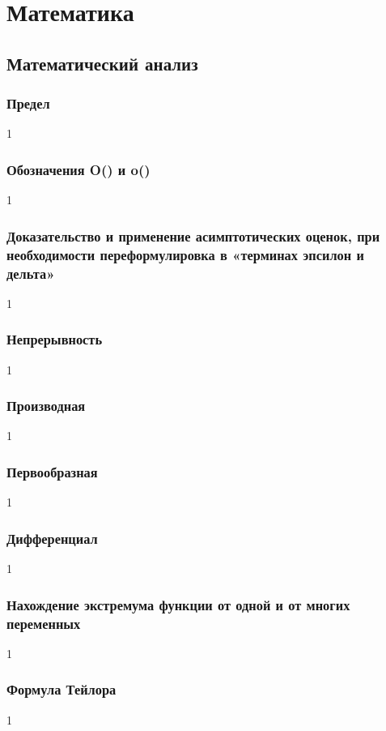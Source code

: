 \documentclass[14pt]{matmex-diploma}
\begin{document}
\tableofcontents

\section{Математика} 


    \subsection{Математический анализ}

        \subsubsection*{Предел}
            1
        \subsubsection*{Обозначения O() и o()}
            1
        \subsubsection*{Доказательство и применение асимптотических оценок, при необходимости переформулировка в «терминах эпсилон и дельта»}
            1
        \subsubsection*{Непрерывность}
            1
        \subsubsection*{Производная}
            1
        \subsubsection*{Первообразная}
            1
        \subsubsection*{Дифференциал}
            1
        \subsubsection*{Нахождение экстремума функции от одной и от многих переменных}
            1
        \subsubsection*{Формула Тейлора}
            1
        
\end{document}
